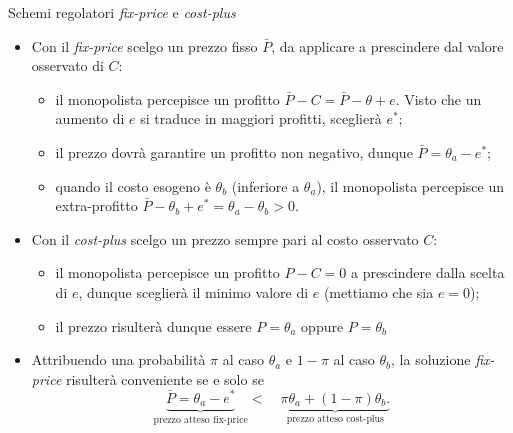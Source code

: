 \documentclass[aspectratio=64,11pt]{beamer}
\begin{document}
\begin{frame}{Schemi regolatori \emph{fix-price} e \emph{cost-plus}}
\begin{itemize}
\item Con il \emph{fix-price} scelgo un prezzo fisso $\bar P$, da applicare a
prescindere dal valore osservato di $C$:
\begin{itemize}
\item il monopolista percepisce un profitto $\bar P - C = \bar P - \theta +
    e$. Visto che un aumento di $e$ si traduce in maggiori profitti, sceglierà
$e^*$;
\item il prezzo dovrà garantire un profitto non negativo, dunque $\bar P=\theta_a-e^*$;
\item quando il costo esogeno è $\theta_b$ (inferiore a $\theta_a$), il
monopolista percepisce un extra-profitto $\bar P-\theta_b+e^*=\theta_a-\theta_b>0$.
\end{itemize}
\item Con il \emph{cost-plus} scelgo un prezzo sempre pari al costo osservato $C$:    
\begin{itemize}
\item il monopolista percepisce un profitto $P-C=0$ a prescindere dalla scelta
di $e$, dunque sceglierà il minimo valore di $e$ (mettiamo che sia $e=0$);
\item il prezzo risulterà dunque essere $P=\theta_a$ oppure $P=\theta_b$
\end{itemize}
\item Attribuendo una probabilità $\pi$ al caso $\theta_a$ e $1-\pi$ al caso
$\theta_b$, la soluzione \emph{fix-price} risulterà conveniente se e solo se
\begin{equation*}
   \underbrace{\bar P=\theta_a-e^*}_{\text{prezzo atteso fix-price}}
   <\quad\underbrace{\pi\theta_a+(1-\pi)\theta_b.}_{\text{prezzo atteso cost-plus}}
\end{equation*}
\end{itemize}
\end{frame}
\end{document}
